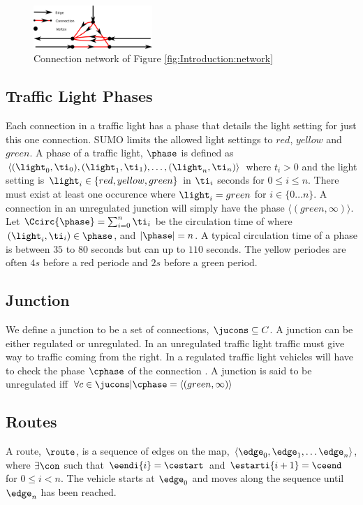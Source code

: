 \begin{figure}[h]
\centering
\includegraphics[width=0.4\textwidth]{../images/ConnectionNetwork.png}
\caption{Connection network of Figure \ref{fig:Introduction:network}}
\label{fig:Model:Connection}
\end{figure}

\subsection{Traffic Light Phases}\label{sec:phases}
Each connection in a traffic light has a phase that details the light setting for just this one connection.
SUMO limits the allowed light settings to $red$, $yellow$ and $green$.
A phase of a traffic light, $\phase$ is defined as $\langle(\light_0, \ti_0),(\light_1, \ti_1),\dots, (\light_n, \ti_n) \rangle$ where $t_i>0$ and the light setting is $\light_i\in \{red, yellow, green\}$ in $\ti_i$ seconds for $0 \leq i \leq n$.
There must exist at least one occurence where $\light_i = green$ for $i \in \{0 \dots n\}$. 
A connection in an unregulated junction will simply have the phase $\langle(green, \infty)\rangle$.
Let $\Ccirc{\phase} = \sum_{i=0}^{n}\ti_i$ be the circulation time of \phase where $(\light_i, \ti_i)\in \phase$, and $|\phase|=n$.
A typical circulation time of a phase is between $35$ to $80$ seconds but can up to $110$ seconds. 
The yellow periodes are often $4s$ before a red periode and $2s$ before a green period\cite{vejtrafik}.

\subsection{Junction}
We define a junction \ju to be a set of connections, $\jucons \subseteq C$. 
A junction can be either regulated or unregulated. 
In an unregulated traffic light traffic must give way to traffic coming from the right. 
In a regulated traffic light vehicles will have to check the phase $\cphase$ of the connection \vehpos. 
A junction is said to be unregulated iff $\forall c \in \jucons | \cphase = \langle(green, \infty)\rangle$

\subsection{Routes}
A route, $\route$, is a sequence of edges on the map, $\langle \edge_0, \edge_1, \dots \edge_n \rangle$, where $\exists \con$ such that $\eendi{i} = \cestart$ and $\estarti{i+1} = \ceend$ for $0\leq i< n$.
The vehicle starts at $\edge_0$ and moves along the sequence until $\edge_n$ has been reached.




